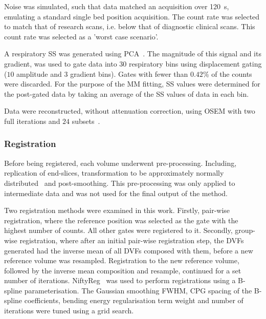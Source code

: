                 Noise was simulated, such that data matched an acquisition over \SI{120}{\second}, emulating a standard single bed position acquisition. The count rate was selected to match that of research scans, i.e. below that of diagnostic clinical scans. This count rate was selected as a 'worst case scenario'.
                
                A respiratory \gls{SS} was generated using \gls{PCA}~\parencite{Thielemans2011}. The magnitude of this signal and its gradient, was used to gate data into $30$ respiratory bins using displacement gating ($10$ amplitude and $3$ gradient bins). Gates with fewer than $0.42$\% of the counts were discarded. For the purpose of the \gls{MM} fitting, \gls{SS} values were determined for the post-gated data by taking an average of the \gls{SS} values of data in each bin.
                
                Data were reconstructed, without attenuation correction, using \gls{OSEM} with two full iterations and $24$ subsets~\parencite{Hudson1994}.
            
            \subsubsection{Registration} \label{sec:comparison_of_motion_correction_methods_incorporating_motion_modelling_for_pet_ct_using_a_single_breath_hold_attenuation_map_registration}
                Before being registered, each volume underwent pre-processing. Including, replication of end-slices, transformation to be approximately normally distributed~\parencite{Johnson2013} and post-smoothing. This pre-processing was only applied to intermediate data and was not used for the final output of the method.%
                
                Two registration methods were examined in this work. Firstly, pair-wise registration, where the reference position was selected as the gate with the highest number of counts. All other gates were registered to it. Secondly, group-wise registration, where after an initial pair-wise registration step, the \glspl{DVF} generated had the inverse mean of all \glspl{DVF} composed with them, before a new reference volume was resampled. Registration to the new reference volume, followed by the inverse mean composition and resample, continued for a set number of iterations. NiftyReg~\parencite{Modat2010} was used to perform registrations using a B-spline parameterisation. The Gaussian smoothing \gls{FWHM}, \gls{CPG} spacing of the B-spline coefficients, bending energy regularisation term weight and number of iterations were tuned using a grid search.
            
